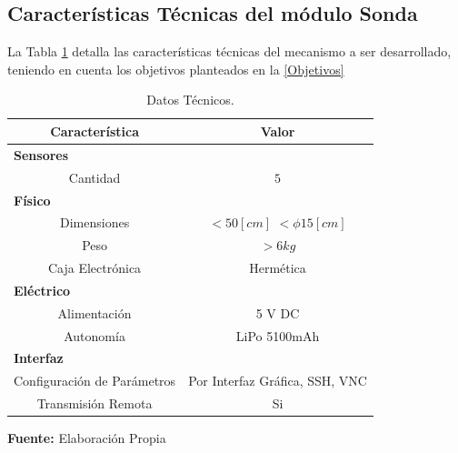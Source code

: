 \subsection[Características Técnicas de los módulos]{Características Técnicas del módulo Sonda}
La Tabla \ref{tab:carac_general2} detalla las características técnicas del mecanismo a ser desarrollado, teniendo en cuenta los objetivos planteados en la \autoref{Objetivos}
\begin{table}[ht]
    \caption[Datos Técnicos]{Datos Técnicos.}
    \label{tab:carac_general2} 
    \centering
    {\begin{tabular}{c c}
        \textbf{Característica} & \textbf{Valor}  \\
        \hline
        \multicolumn{2}{l}{\textbf{Sensores}} \\
        Cantidad & $ 5 $   \\
        \multicolumn{2}{l}{\textbf{Físico}} \\
        Dimensiones & $< 50 [cm]$  $< \phi 15[cm]$   \\
        Peso &  $ > 6 kg$ \\
        Caja Electrónica & Herm\'etica  \\
        \multicolumn{2}{l}{\textbf{Eléctrico}} \\
         Alimentación & 5 V DC  \\
         Autonomía & LiPo 5100mAh  \\
         \multicolumn{2}{l}{\textbf{Interfaz}} \\
         Configuración de Parámetros & Por Interfaz Gráfica, SSH, VNC  \\
         Transmisi\'on Remota  & Si  \\
        \hline
    \end{tabular}}
    \vspace{5mm}
    \newline
    \hfill \textbf{Fuente:} Elaboración Propia
\end{table}
